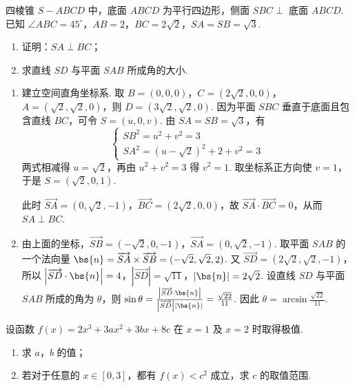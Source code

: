 \begin{problem}
四棱锥 \(S - ABCD\) 中，底面 \(ABCD\) 为平行四边形，侧面 \(SBC \perp\) 底面 \(ABCD\). 已知 \(\angle ABC = 45^{\circ}\)，\(AB = 2\)，\(BC = 2\sqrt{2}\)，\(SA = SB = \sqrt{3}\).

\begin{enumerate}
\item 证明：\(SA \perp BC\)；
\item 求直线 \(SD\) 与平面 \(SAB\) 所成角的大小.
\end{enumerate}

\end{problem}

\begin{solution}
\begin{enumerate}
\item 建立空间直角坐标系. 取
\(B=(0,0,0)\)，\(C=(2\sqrt{2},0,0)\)，\(A=(\sqrt{2},\sqrt{2},0)\)，则
\(D=(3\sqrt{2},\sqrt{2},0)\). 因为平面 \(SBC\) 垂直于底面且包含直线 \(BC\)，可令
\(S=(u,0,v)\). 由 \(SA=SB=\sqrt{3}\)，有
\[
\begin{cases}
SB^2=u^2+v^2=3\\
SA^2=(u-\sqrt{2})^2+2+v^2=3
\end{cases}
\]
两式相减得 \(u=\sqrt{2}\)，再由 \(u^2+v^2=3\) 得 \(v^2=1\). 取坐标系正方向使 \(v=1\)，于是 \(S=(\sqrt{2},0,1)\).

此时 \(\overrightarrow{SA}=(0,\sqrt{2},-1)\)，\(\overrightarrow{BC}=(2\sqrt{2},0,0)\)，故
\(\overrightarrow{SA}\cdot\overrightarrow{BC}=0\)，从而 \(SA\perp BC\).
\item 由上面的坐标，\(\overrightarrow{SB}=(-\sqrt{2},0,-1)\)，\(\overrightarrow{SA}=(0,\sqrt{2},-1)\). 取平面 \(SAB\) 的一个法向量
\(\bs{n}=\overrightarrow{SA}\times\overrightarrow{SB}=(-\sqrt{2},\sqrt{2},2)\). 又
\(\overrightarrow{SD}=(2\sqrt{2},\sqrt{2},-1)\)，所以
\(\left|\overrightarrow{SD}\cdot\bs{n}\right|=4\)，\(\left|\overrightarrow{SD}\right|=\sqrt{11}\)，\(\left|\bs{n}\right|=2\sqrt{2}\).
设直线 \(SD\) 与平面 \(SAB\) 所成的角为 \(\theta\)，则
\(\sin\theta=\frac{\left|\overrightarrow{SD}\cdot\bs{n}\right|}{\left|\overrightarrow{SD}\right|\left|\bs{n}\right|}=\frac{\sqrt{22}}{11}\). 因此
\(\theta=\arcsin\frac{\sqrt{22}}{11}\).
\end{enumerate}
\end{solution}

\begin{problem}
设函数 \(f(x) = 2x^{3} + 3ax^{2} + 3bx + 8c\) 在 \(x = 1\) 及 \(x = 2\) 时取得极值.

\begin{enumerate}
\item 求 \(a\)，\(b\) 的值；
\item 若对于任意的 \(x \in [0,3]\)，都有 \(f(x) < c^{2}\) 成立，求 \(c\) 的取值范围.
\end{enumerate}
\end{problem}

